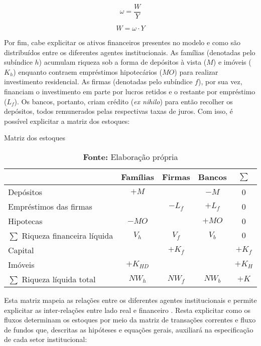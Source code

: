 $$
\omega = \frac{W}{Y}
$$

\begin{equation}
\label{_W}
    W = \omega\cdot Y
\end{equation}

Por fim, cabe explicitar os ativos financeiros presentes no modelo e como são distribuídos entre os diferentes agentes institucionais. As famílias (denotadas pelo subíndice $h$) acumulam riqueza sob a forma de depósitos à vista ($M$) e imóveis ($K_h$) enquanto contraem empréstimos hipotecários ($MO$) para realizar investimento residencial. 
As firmas (denotadas pelo subíndice $f$), por sua vez, financiam o investimento em parte por lucros retidos e o restante por empréstimo ($L_f$). Os bancos, portanto, criam crédito (\textit{ex nihilo}) para então recolher os depósitos, todos remunerados pelas respectivas taxas de juros. Com isso, é possível explicitar a matriz dos estoques:


\begin{table}[H]
\centering
\caption{Matriz dos estoques}
\begin{tabular}{lcccc}
\hline
\hline


                          & Famílias      & Firmas        & Bancos  &    $\sum$ \\ \hline

Depósitos & $+M$ & & $-M$ & 0\\
Empréstimos das firmas & &$-L_f$& $+L_f$ & 0\\
Hipotecas &$-MO$&  & $+MO$ & 0\\\hline
$\sum$ Riqueza financeira líquida &$V_h$&$V_f$&$V_b$& $0$\\\hline
Capital & &$+K_f$&  & $+K_f$\\
Imóveis &$+K_{HD}$& &   & $+K_{H}$\\\hline
$\sum$ Riqueza líquida total&$NW_h$&$NW_f$&$NW_b$& $+K$\\
\hline
\hline
\end{tabular}%
\caption*{\textbf{Fonte:} Elaboração própria}
\end{table}

Esta matriz mapeia as relações entre os diferentes agentes institucionais e permite explicitar as inter-relações entre lado real e financeiro \cite{dos_santos_revisiting_2010}. Resta explicitar como os fluxos determinam os estoques por meio da matriz de transações correntes e fluxo de fundos que, descritas as hipóteses e equações gerais, auxiliará na especificação de cada setor institucional:

